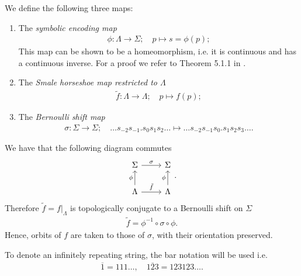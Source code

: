 \begin{definition}
	We define the following three maps:
	\begin{enumerate}
		
\item The \emph{symbolic encoding map}
	\begin{align}
		\boxed{
			\phi:\Lambda \to \Sigma;\quad p \mapsto s= \phi(p);
		}
	\end{align}
This map can be shown to be a homeomorphism, i.e. it is continuous and has a continuous inverse. For a proof we refer to Theorem 5.1.1 in \cite{GuckenheimerHolmes}.

\item The \emph{Smale horseshoe map restricted to $\Lambda$}
	\begin{align}
		\boxed{
			\tilde{f}:\Lambda \to \Lambda;\quad p \mapsto f(p);
		}
	\end{align}
\item The \emph{Bernoulli shift map}
	\begin{align}
		\boxed{
			\sigma:\Sigma \to \Sigma;\quad
			\ldots s_{-2} s_{-1} \bm{.} s_0 s_1 s_2 \ldots 
			\mapsto
			\ldots s_{-2}s_{-1}s_{0}\bm{.} s_1 s_2 s_3 \ldots.
		}
	\end{align}
	
	\end{enumerate}
\end{definition}
We have that the following diagram commutes
\begin{equation}
\begin{tikzcd}
	\Sigma \arrow[r, "\sigma"] 
& \Sigma \\
\Lambda \arrow[u,"\phi"] \arrow[r, "\tilde{f}"]
& \Lambda \arrow[u, "\phi"] 
\end{tikzcd}.
\end{equation}
Therefore $\tilde{f} = \left. f\right|_{\Lambda}$ is topologically conjugate to a Bernoulli shift on $\Sigma$ 
	\begin{align}
		\tilde{f} = \phi^{-1} \circ \sigma \circ \phi.
	\end{align}
Hence, orbits of $f$ are taken to those of $\sigma$, with their orientation preserved.	

\begin{remark}[]
	To denote an infinitely repeating string, the bar notation will be used i.e.
	\begin{align}
		\overline{1} = 111\ldots,\quad \overline{123}=123123\ldots.
	\end{align}
\end{remark}

